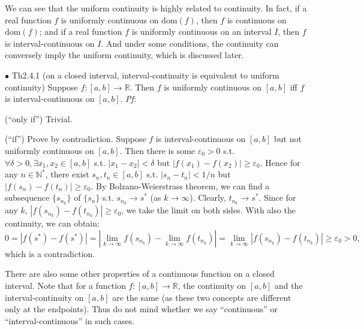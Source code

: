 \documentclass{article}
\begin{document}
\begin{Rmk}{}
    We can see that the uniform continuity is highly related to continuity. In fact, \textcolor{Th}{if a real function $f$ is uniformly continuous on $\text{dom}(f)$, then $f$ is continuous on $\text{dom}(f)$; and if a real function $f$ is uniformly continuous on an interval $I$, then $f$ is interval-continuous on $I$.} And under some conditions, the continuity can conversely imply the uniform continuity, which is discussed later.
\end{Rmk}

\begin{Th}{$\bullet$ Th2.4.1 (on a closed interval, interval-continuity is equivalent to uniform continuity)}
    Suppose $f:[a,b]\rightarrow\mathbb{R}$. Then $f$ is uniformly continuous on $[a,b]$ iff $f$ is interval-continuous on $[a,b]$.
    \tcblower
    \textit{Pf}: 
    \begin{compactenum}
        \item (``only if'') Trivial.
        \item (``if'') Prove by contradiction. Suppose $f$ is interval-continuous on $[a,b]$ but not uniformly continuous on $[a,b]$. Then there is some $\varepsilon_0>0$ s.t. $\forall\delta>0, \exists x_1, x_2\in[a,b]$ s.t. $|x_1-x_2|<\delta$ but $|f(x_1)-f(x_2)|\geq\varepsilon_0$. Hence for any $n\in\mathbb{N}^*$, there exist $s_n, t_n\in [a,b]$ s.t. $|s_n-t_n|<1/n$ but $|f(s_n)-f(t_n)|\geq \varepsilon_0$. By Bolzano-Weierstrass theorem, we can find a subsequence $\{s_{n_k}\}$ of $\{s_n\}$ s.t. $s_{n_k}\rightarrow s^*$ (as $k\rightarrow\infty$). Clearly, $t_{n_k}\rightarrow s^*$. Since for any $k$, $|f(s_{n_k})-f(t_{n_k})|\geq\varepsilon_0$, we take the limit on both sides. With also the continuity, we can obtain:
        $$0 = |f(s^*)-f(s^*)| = |\lim\limits_{k\to\infty} f(s_{n_k})-\lim\limits_{k\to\infty}f(t_{n_k})| = \lim\limits_{k\to\infty} |f(s_{n_k})-f(t_{n_k})|\geq \varepsilon_0 > 0,$$
        which is a contradiction.
    \end{compactenum}
\end{Th}

\begin{Rmk}{}
    There are also some other properties of a continuous function on a closed interval. Note that \textcolor{Th}{for a function $f:[a,b]\rightarrow \mathbb{R}$, the continuity on $[a,b]$ and the interval-continuity on $[a,b]$ are the same (as these two concepts are different only at the endpoints).} Thus do not mind whether we say ``continuous'' or ``interval-continuous'' in such cases.
\end{Rmk}
\end{document}
